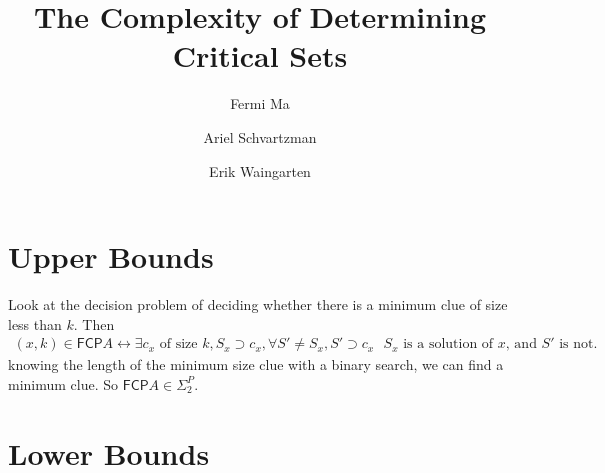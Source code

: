 \documentclass[runningheads,a4paper]{llncs}
\begin{document}
\mainmatter  %

\title{The Complexity of Determining Critical Sets}


%
%
\author{Fermi Ma \and Ariel Schvartzman \and Erik Waingarten}
%


%
%

\maketitle

\section{Upper Bounds}

Look at the decision problem of deciding whether there is a minimum clue of size less than $k$. Then
\begin{align}
(x, k) \in \mathsf{FCP} A \leftrightarrow \exists c_x \text{ of size $k$}, S_x \supset c_x, \forall S' \neq S_x, S' \supset c_x \text{ $S_x$ is a solution of $x$, and $S'$ is not.}
\end{align}
knowing the length of the minimum size clue with a binary search, we can find a minimum clue. So $\mathsf{FCP} A \in \Sigma_2^P$. 

\section{Lower Bounds}
\end{document}
